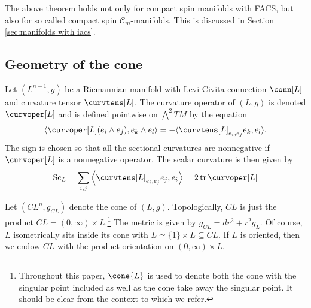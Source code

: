 \documentclass[12pt, reqno]{amsart}
\theoremstyle{plain} %
\theoremstyle{definition}
\theoremstyle{remark}
\numberwithin{equation}{section}
\newcommand{\cat}[1]{\mathcal{#1}}
\newcommand{\Sc}{\mathrm{Sc}}
\newcommand{\inner}[1]{\langle #1 \rangle}
\newcommand{\tdim}{n} %
\DeclareMathOperator{\trac}{tr} %
\begin{document}
The above theorem holds not only for compact spin manifolds with FACS, but also for so called compact spin \(\cat{C}_m\)-manifolds.
This is discussed in Section \ref{sec:manifolds with iacs}.

\subsection{Geometry of the cone}
Let \((L^{\tdim-1},g)\) be a Riemannian manifold with Levi-Civita connection \(\conn[L]\) and curvature tensor \(\curvtens[L]\).
The curvature operator of \((L,g)\) is denoted \(\curvoper[L]\) and is defined pointwise on \(\bigwedge^2TM\) by the equation
\begin{equation*}
    \inner{\curvoper[L](e_i\wedge e_j),e_k\wedge e_l}=-\inner{\curvtens[L]_{e_i,e_j}e_k,e_l}.
\end{equation*}
The sign is chosen so that all the sectional curvatures are nonnegative if \(\curvoper[L]\) is a nonnegative operator.
The scalar curvature is then given by
\begin{equation*}
    \Sc_L=\sum_{i,j}\left<\curvtens[L]_{e_i,e_j}e_j,e_i\right>=2\trac\curvoper[L]
\end{equation*}

Let \((CL^{\tdim},g_{CL})\) denote the cone of \((L,g)\).
Topologically, \(CL\) is just the product \(CL = (0,\infty)\times L\).\footnote{Throughout this paper, \(\cone{L}\) is used to denote both the cone with the singular point included as well as the cone take away the singular point. It should be clear from the context to which we refer.} The metric is given by \(g_{CL}=dr^2 + r^2g_L\).
Of course, \(L\) isometrically sits inside its cone with \(L\simeq \{1\}\times L \subseteq CL\).
If \(L\) is oriented, then we endow \(CL\) with the product orientation on \((0, \infty) \times L\).
\end{document}

